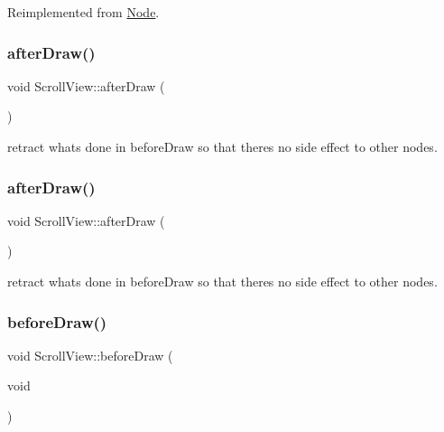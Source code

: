 Reimplemented from \hyperlink{classNode_abed32867e81e7902c8155dca7d347a18}{Node}.

\mbox{\label{classScrollView_a1dbdfe5db3d1d1dbfe2099c2167818e3}} 
\subsubsection{\texorpdfstring{after\+Draw()}{afterDraw()}\hspace{0.1cm}{\footnotesize\ttfamily [1/2]}}
{\footnotesize\ttfamily void Scroll\+View\+::after\+Draw (\begin{DoxyParamCaption}{ }\end{DoxyParamCaption})\hspace{0.3cm}{\ttfamily [protected]}}

retract what\textquotesingle{}s done in before\+Draw so that there\textquotesingle{}s no side effect to other nodes. \mbox{\label{classScrollView_a1dbdfe5db3d1d1dbfe2099c2167818e3}} 
\subsubsection{\texorpdfstring{after\+Draw()}{afterDraw()}\hspace{0.1cm}{\footnotesize\ttfamily [2/2]}}
{\footnotesize\ttfamily void Scroll\+View\+::after\+Draw (\begin{DoxyParamCaption}{ }\end{DoxyParamCaption})\hspace{0.3cm}{\ttfamily [protected]}}

retract what\textquotesingle{}s done in before\+Draw so that there\textquotesingle{}s no side effect to other nodes. \mbox{\label{classScrollView_a4576d3e279850eb6f31c1fa48aeb8d6e}} 
\subsubsection{\texorpdfstring{before\+Draw()}{beforeDraw()}\hspace{0.1cm}{\footnotesize\ttfamily [1/2]}}
{\footnotesize\ttfamily void Scroll\+View\+::before\+Draw (\begin{DoxyParamCaption}\item[{void}]{ }\end{DoxyParamCaption})\hspace{0.3cm}{\ttfamily [protected]}}

